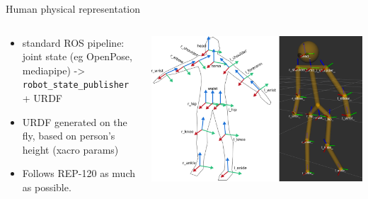 \documentclass[xcolor=table]{beamer}
\begin{document}
\begin{frame}{Human physical representation}

    \begin{columns}
        \begin{column}{0.4\linewidth}
            \begin{itemize}
                \item standard ROS pipeline: joint state (eg OpenPose, mediapipe) -> \texttt{robot\_state\_publisher} + URDF

                \item URDF generated on the fly, based on person’s height (xacro params)

                \item Follows REP-120 as much as possible.
            \end{itemize}
        \end{column}
        \begin{column}{0.6\linewidth}
            \begin{center}
                \includegraphics[width=\linewidth]{ros4hri/skeletons}
            \end{center}
        \end{column}
    \end{columns}
\end{frame}
\end{document}
